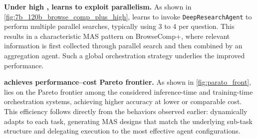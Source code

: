 \textbf{Under high \masness, \ourframework learns to exploit parallelism.}
As shown in \cref{fig:7b_120b_browse_comp_plus_high}, \ourframework
learns to
invoke \texttt{DeepResearchAgent} to perform multiple parallel searches,
typically using 3 to 4 per
question.
This results in a characteristic MAS pattern on BrowseComp+, where relevant information is first collected through parallel search and then combined by an aggregation agent. Such a global orchestration strategy underlies the improved performance.


\textbf{\ourframework achieves performance–cost Pareto frontier.}
As shown in \cref{fig:parato_front}, \ourframework lies on the Pareto frontier among the considered inference-time and training-time orchestration systems, achieving higher accuracy at lower or comparable cost. This efficiency follows directly from the behaviors observed earlier: \ourframework dynamically adapts to each task, generating MAS designs that match the underlying sub-task structure and delegating execution to the most effective agent configurations.


